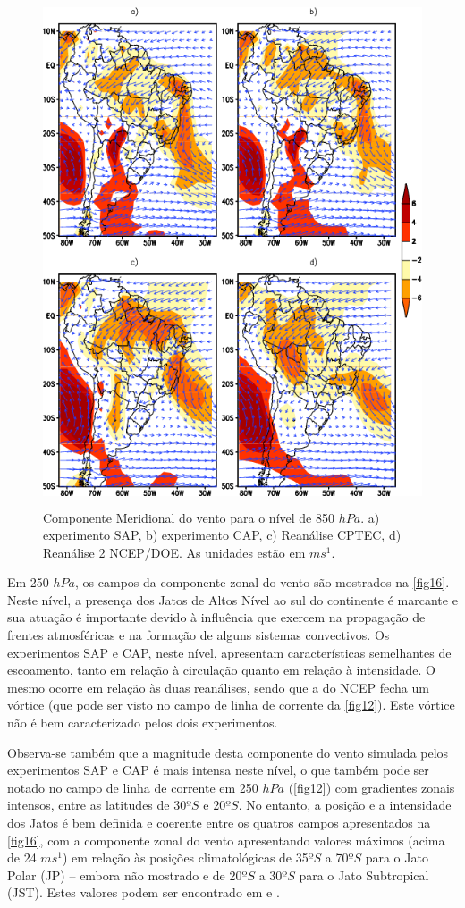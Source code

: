 \begin{figure}[!hbp]
\centering
\includegraphics[height=15cm]{./figs/media_vento-meridional_anl_850hPa.png}
\caption{Componente Meridional do vento para o nível de 850 $hPa$. a) experimento SAP, b) experimento CAP, c) Reanálise CPTEC, d) Reanálise 2 NCEP/DOE. As unidades estão em $ms^{1}$.}
\label{fig15}
\end{figure}

Em 250 $hPa$, os campos da componente zonal do vento são mostrados na \autoref{fig16}. Neste nível, a presença dos Jatos de Altos Nível ao sul do continente é marcante e sua atuação é importante devido à influência que exercem na propagação de frentes atmosféricas e na formação de alguns sistemas convectivos. Os experimentos SAP e CAP, neste nível, apresentam características semelhantes de escoamento, tanto em relação à circulação quanto em relação à intensidade. O mesmo ocorre em relação às duas reanálises, sendo que a do NCEP fecha um vórtice (que pode ser visto no campo de linha de corrente da \autoref{fig12}). Este vórtice não é bem caracterizado pelos dois experimentos. 

Observa-se também que a magnitude desta componente do vento simulada pelos experimentos SAP e CAP é mais intensa neste nível, o que também pode ser notado no campo de linha de corrente em 250 $hPa$ (\autoref{fig12}) com gradientes zonais intensos, entre as latitudes de 30$ºS$ e 20$ºS$. No entanto, a posição e a intensidade dos Jatos é bem definida e coerente entre os quatros campos apresentados na \autoref{fig16}, com a componente zonal do vento apresentando valores máximos (acima de 24 $ms^{1}$) em relação às posições climatológicas de 35$ºS$ a 70$ºS$ para o Jato Polar (JP) – embora não mostrado e de 20$ºS$ a 30$ºS$ para o Jato Subtropical (JST). Estes valores podem ser encontrado em  e . 

